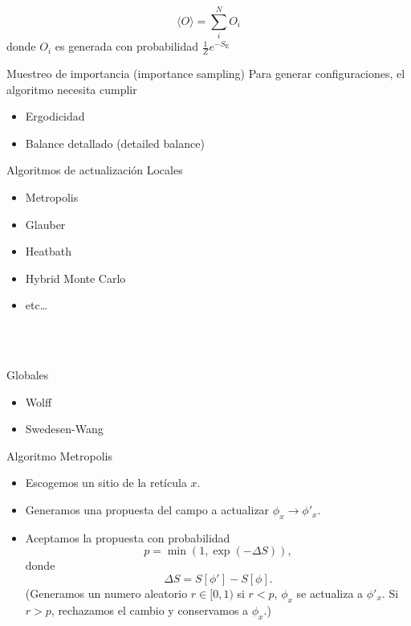 \documentclass[11pt]{beamer}
\begin{document}
\begin{frame}
    $$\langle O \rangle = \sum_i^{N} O_i$$
    donde $O_i$ es generada con probabilidad $\frac{1}{Z}e^{-S_{\text{E}}}$
\end{frame}

\begin{frame}{Muestreo de importancia (importance sampling)}
    Para generar configuraciones, el algoritmo necesita cumplir
    \begin{itemize}
        \item Ergodicidad
        \item Balance detallado (detailed balance)
    \end{itemize}
\end{frame}

\begin{frame}{Algoritmos de actualización}
    Locales
    \begin{itemize}
        \item Metropolis
        \item Glauber
        \item Heatbath
        \item Hybrid Monte Carlo
        \item etc\dots
    \end{itemize}
    
    \ \\~
    
    Globales
    \begin{itemize}
        \item Wolff
        \item Swedesen-Wang
    \end{itemize}
\end{frame}

\begin{frame}{Algoritmo Metropolis}
    \begin{itemize}
        \item Escogemos un sitio de la retícula $x$.
        \item Generamos una propuesta del campo a actualizar $\phi_x \to \phi'_x$.
        \item Aceptamos la propuesta con probabilidad 
        $$ p = \min\left(1, \exp\left(-\Delta S\right)\right),$$
           donde
        $$ \Delta S = S[\phi'] - S[\phi].$$        
        (Generamos un numero aleatorio $r\in[0,1)$ si $r<p$, $\phi_x$ se actualiza a $\phi'_x$. Si $r>p$, rechazamos el cambio y conservamos a $\phi_x$.)
      
    \end{itemize}
\end{frame}
\end{document}
